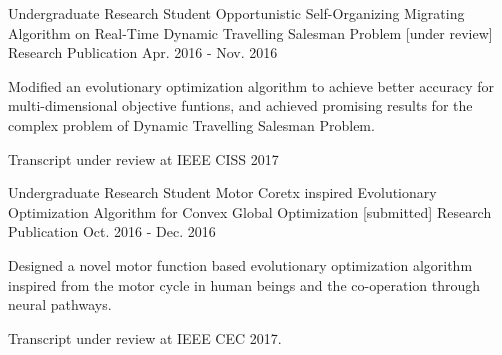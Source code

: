 \begin{cventries}
    \cventry
    {Undergraduate Research Student}
    {Opportunistic Self-Organizing Migrating Algorithm on Real-Time Dynamic Travelling Salesman Problem [under review]}
    {Research Publication}
    {Apr. 2016 - Nov. 2016}
    {
      \begin{cvitems}
        \item {Modified an evolutionary optimization algorithm to achieve better accuracy for multi-dimensional objective funtions, and achieved promising results for the complex problem of Dynamic Travelling Salesman Problem.}
        \item {Transcript under review at IEEE CISS 2017}
      \end{cvitems}
    }
    \cventry
    {Undergraduate Research Student}
    {Motor Coretx inspired Evolutionary Optimization Algorithm for Convex Global Optimization [submitted]}
    {Research Publication}
    {Oct. 2016 - Dec. 2016}
    {
      \begin{cvitems}
        \item {Designed a novel motor function based evolutionary optimization algorithm inspired from the motor cycle in human beings and the co-operation through neural pathways.}
        \item {Transcript under review at IEEE CEC 2017.}
      \end{cvitems}
    }
\end{cventries}

